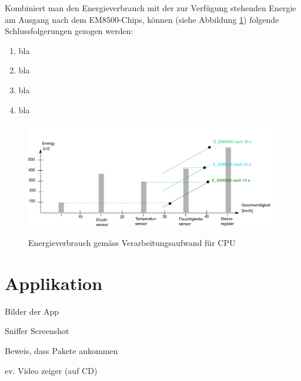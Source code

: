 Kombiniert man den Energieverbrauch mit der zur Verfügung stehenden Energie am Ausgang nach dem EM8500-Chips, können (siehe Abbildung \ref{resultat_Zsm_Energy}) folgende Schlussfolgerungen gezogen werden:

\begin{enumerate}
    \item bla
    \item bla
    \item bla
    \item bla
\end{enumerate}

\begin{figure}[ht]
\includegraphics[width=1\textwidth]{4Resultate/imag/EnergyVerbrauchZusammenfassung.png}\label{resultat_Zsm_Energy} 
\caption{Energieverbrauch gemäss Verarbeitungsaufwand für CPU}
\end{figure}


\section{Applikation}

Bilder der App

Sniffer Screenshot

Beweis, dass Pakete ankommen

ev. Video zeiger (auf CD)






